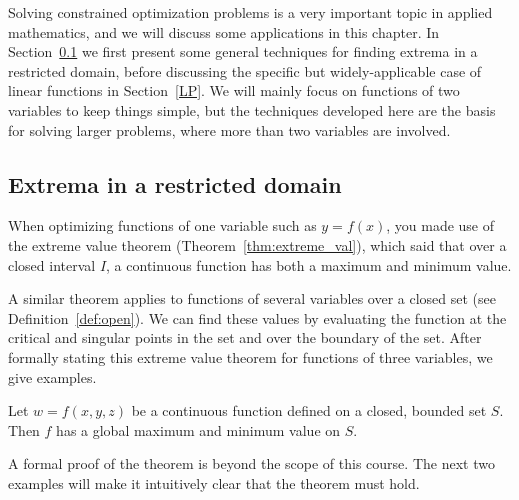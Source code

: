 Solving constrained optimization problems is a very important topic in applied mathematics, and we will discuss some applications in this chapter. In Section~\ref{CO} we first present some general techniques for finding extrema in a restricted domain, before discussing the specific but widely-applicable case of linear functions in Section~\ref{LP}.  We will mainly focus on functions of two variables to keep things simple, but the techniques developed here are the basis for solving larger problems, where more than two variables are involved.

\subsection{Extrema in a restricted domain}
\label{CO}
When optimizing functions of one variable such as $y=f(x)$, you made use of the extreme value theorem (Theorem~\ref{thm:extreme_val}), which said that over a closed interval $I$, a continuous function has both a maximum and minimum value.

A similar theorem applies to functions of several variables  over a closed set (see Definition~\ref{def:open}). We can find these values by evaluating the function at the critical and singular points in the set and over the boundary of the set. After formally stating this extreme value theorem for functions of three variables, we give examples.

\begin{theorem}
\label{EVT}
Let $w=f(x,y,z)$ be a continuous function defined on a closed, bounded set $S$. Then $f$ has a global maximum and minimum value on $S$.
\end{theorem}
\ifanalysis
A formal proof of the theorem is beyond the scope of this course. The next two examples will make it intuitively clear that the theorem must hold. 
\fi


